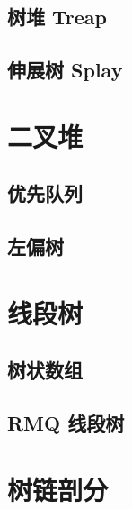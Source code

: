 	\subsection{树堆 Treap}\small


	\subsection{伸展树 Splay}\small


\section{二叉堆}\small


	\subsection{优先队列}\small


	\subsection{左偏树}\small


\section{线段树}\small


	\subsection{树状数组}\small


	\subsection{RMQ 线段树}\small


\section{树链剖分}\small


